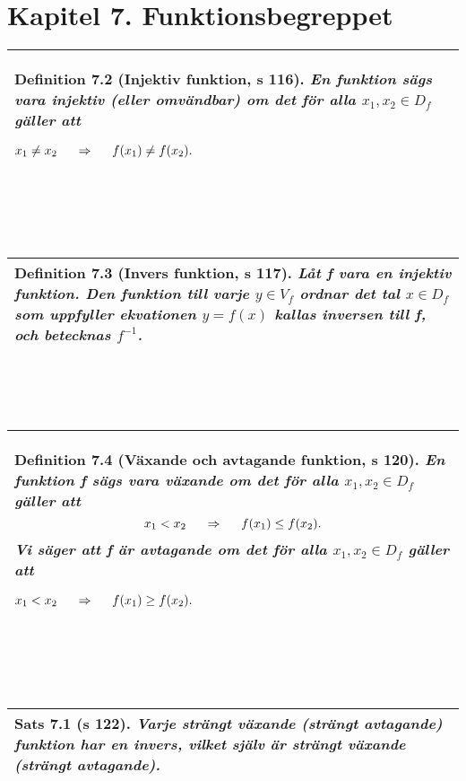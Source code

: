 \documentclass[a4paper]{article}
\begin{document}
\section*{Kapitel 7. Funktionsbegreppet}
\begin{tabular}{|L{11.5cm}|} \hline
\textbf{Definition 7.2} (Injektiv funktion, s 116). 
\textit{En funktion sägs vara \textbf{injektiv} (eller \textbf{omvändbar}) om det för alla $x_1,x_2 \in D_f$ gäller att} 
\begin{center}
$x_1 \neq x_2 \hspace{0.5cm} \Rightarrow \hspace{0.5cm} f(x_1) \neq f(x_2).$
\end{center}
\\\hline
\end{tabular}
\\\\\\
\begin{tabular}{|L{11.5cm}|} \hline
\textbf{Definition 7.3} (Invers funktion, s 117). 
\textit{Låt f vara en injektiv funktion. Den funktion till varje $y \in V_f$ ordnar det tal $x \in D_f$ som uppfyller ekvationen $y=f(x)$ kallas \textbf{inversen} till f, och betecknas $f^{-1}$.}
\\\hline
\end{tabular}
\\\\\\
\begin{tabular}{|L{11.5cm}|} \hline
\textbf{Definition 7.4} (Växande och avtagande funktion, s 120). 
\textit{En funktion f sägs vara \textbf{växande} om det för alla $x_1, x_2 \in D_f$ gäller att}
\begin{displaymath}
x_1 < x_2 \hspace{0.5cm} \Rightarrow \hspace{0.5cm} f(x_1) \leq f(x_2).
\end{displaymath}
\textit{Vi säger att f är \textbf{avtagande} om det för alla $x_1,x_2 \in D_f$ gäller att}
\begin{center}
$x_1 < x_2 \hspace{0.5cm} \Rightarrow \hspace{0.5cm} f(x_1) \geq f(x_2).$
\end{center}
\\\hline
\end{tabular}
\\\\\\
\begin{tabular}{|L{11.5cm}|} \hline
\textbf{Sats 7.1} (s 122). 
\textit{Varje strängt växande (strängt avtagande) funktion har en invers, vilket själv är strängt växande (strängt avtagande).}
\\\hline
\end{tabular}
\end{document}
